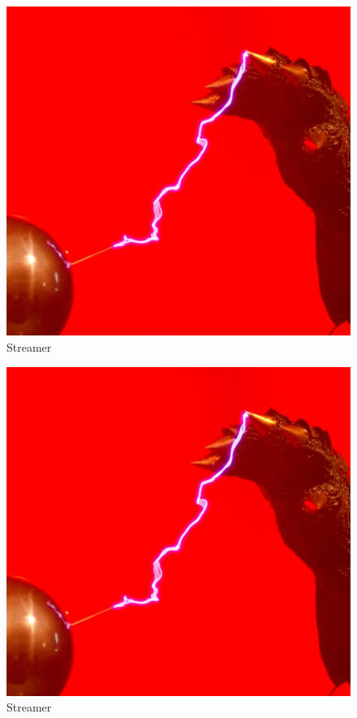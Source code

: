 \begin{figure}
    \centering
    \includegraphics{img/foto/Streamer.jpg}
    \caption{Streamer}
    \label{fig:foto:streamer}
\end{figure}

\begin{figure}
    \centering
    \includegraphics{img/foto/Streamer.jpg}
    \caption{Streamer}
    \label{fig:foto:streamer}
\end{figure}

